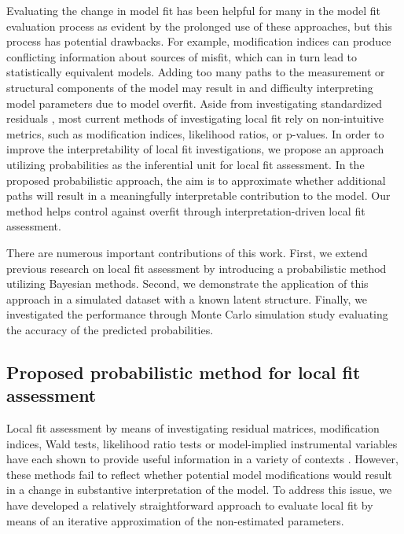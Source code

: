 \documentclass[man, noextraspace, floatsintext, 12pt]{apa7}
\begin{document}
Evaluating the change in model fit has been helpful for many in the model fit evaluation process as evident by the prolonged use of these approaches, but this process has potential drawbacks.
For example, modification indices can produce conflicting information about sources of misfit, which can in turn lead to statistically equivalent models.
Adding too many paths to the measurement or structural components of the model may result in and difficulty interpreting model parameters due to model overfit.
Aside from investigating standardized residuals \citep{Maydeu2017}, most current methods of investigating local fit rely on non-intuitive metrics, such as modification indices, likelihood ratios, or p-values.
In order to improve the interpretability of local fit investigations, we propose an approach utilizing probabilities as the inferential unit for local fit assessment. 
In the proposed probabilistic approach, the aim is to approximate whether additional paths will result in a meaningfully interpretable contribution to the model.
Our method helps control against overfit through interpretation-driven local fit assessment.

There are numerous important contributions of this work.
First, we extend previous research on local fit assessment by introducing a probabilistic method utilizing Bayesian methods. 
Second, we demonstrate the application of this approach in a simulated dataset with a known latent structure.
Finally, we investigated the performance through Monte Carlo simulation study evaluating the accuracy of the predicted probabilities.

\subsection{Proposed probabilistic method for local fit assessment}

Local fit assessment by means of investigating residual matrices, modification indices, Wald tests, likelihood ratio tests or model-implied instrumental variables have each shown to provide useful information in a variety of contexts \citep{Chou1990, Whittaker2012, Maydeu2017}.
However, these methods fail to reflect whether potential model modifications would result in a change in substantive interpretation of the model.  
To address this issue, we have developed a relatively straightforward approach to evaluate local fit by means of an iterative approximation of the non-estimated parameters.
\end{document}
